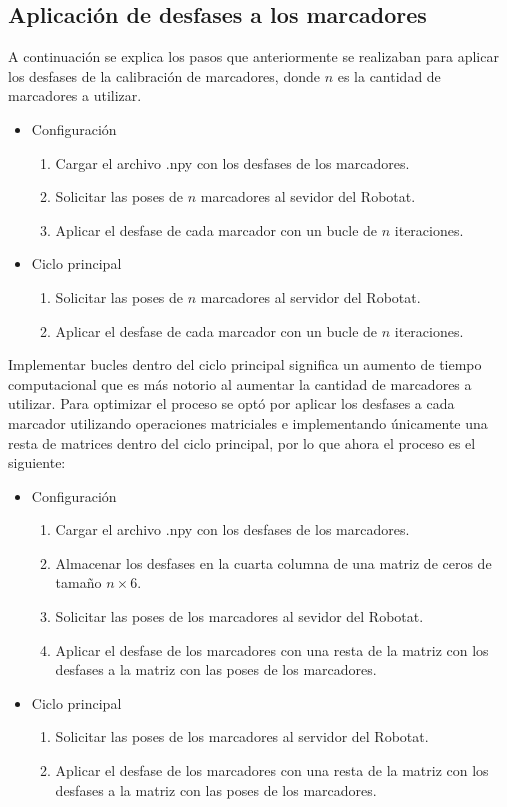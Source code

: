 \subsection{Aplicación de desfases a los marcadores}
A continuación se explica los pasos que anteriormente se realizaban para aplicar los desfases de la calibración de marcadores, donde $n$ es la cantidad de marcadores a utilizar.

\begin{itemize}
	\item Configuración
	\begin{enumerate}
		\item Cargar el archivo .npy con los desfases de los marcadores.
		\item Solicitar las poses de $n$ marcadores al sevidor del Robotat.
		\item Aplicar el desfase de cada marcador con un bucle de $n$ iteraciones.
	\end{enumerate}
	\item Ciclo principal 
	\begin{enumerate}
		\item Solicitar las poses de $n$ marcadores al servidor del Robotat.
		\item Aplicar el desfase de cada marcador con un bucle de $n$ iteraciones.
	\end{enumerate}
\end{itemize}

Implementar bucles dentro del ciclo principal significa un aumento de tiempo computacional que es más notorio al aumentar la cantidad de marcadores a utilizar. Para optimizar el proceso se optó por aplicar los desfases a cada marcador utilizando operaciones matriciales e implementando únicamente una resta de matrices dentro del ciclo principal, por lo que ahora el proceso es el siguiente:

\begin{itemize}
	\item Configuración
	\begin{enumerate}
		\item Cargar el archivo .npy con los desfases de los marcadores.
		\item Almacenar los desfases en la cuarta columna de una matriz de ceros de tamaño $n \times 6$.
		\item Solicitar las poses de los marcadores al sevidor del Robotat.
		\item Aplicar el desfase de los marcadores con una resta de la matriz con los desfases a la matriz con las poses de los marcadores.
	\end{enumerate}
	\item Ciclo principal 
	\begin{enumerate}
		\item Solicitar las poses de los marcadores al servidor del Robotat.
		\item Aplicar el desfase de los marcadores con una resta de la matriz con los desfases a la matriz con las poses de los marcadores.
	\end{enumerate}
\end{itemize}

